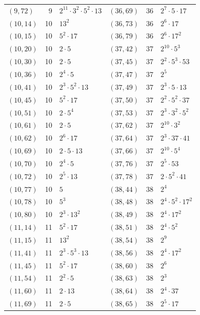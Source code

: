\documentclass[11pt]{article}
\begin{document}
\begin{longtable}{@{}lrl@{\qquad}lrl@{}}
$(9,72)$ & 9 & $2^{11}\cdot 3^{2}\cdot 5^{2}\cdot 13$ & $(36,69)$ & 36 & $2^{7}\cdot 5\cdot 17$\\
$(10,14)$ & 10 & $13^{2}$ & $(36,73)$ & 36 & $2^{6}\cdot 17$\\
$(10,15)$ & 10 & $5^{2}\cdot 17$ & $(36,79)$ & 36 & $2^{6}\cdot 17^{2}$\\
$(10,20)$ & 10 & $2\cdot 5$ & $(37,42)$ & 37 & $2^{10}\cdot 5^{3}$\\
$(10,30)$ & 10 & $2\cdot 5$ & $(37,45)$ & 37 & $2^{2}\cdot 5^{3}\cdot 53$\\
$(10,36)$ & 10 & $2^{4}\cdot 5$ & $(37,47)$ & 37 & $2^{5}$\\
$(10,41)$ & 10 & $2^{3}\cdot 5^{2}\cdot 13$ & $(37,49)$ & 37 & $2^{3}\cdot 5\cdot 13$\\
$(10,45)$ & 10 & $5^{2}\cdot 17$ & $(37,50)$ & 37 & $2^{2}\cdot 5^{2}\cdot 37$\\
$(10,51)$ & 10 & $2\cdot 5^{4}$ & $(37,53)$ & 37 & $2^{3}\cdot 3^{2}\cdot 5^{2}$\\
$(10,61)$ & 10 & $2\cdot 5$ & $(37,62)$ & 37 & $2^{10}\cdot 3^{2}$\\
$(10,62)$ & 10 & $2^{6}\cdot 17$ & $(37,64)$ & 37 & $2^{3}\cdot 37\cdot 41$\\
$(10,69)$ & 10 & $2\cdot 5\cdot 13$ & $(37,66)$ & 37 & $2^{10}\cdot 5^{4}$\\
$(10,70)$ & 10 & $2^{4}\cdot 5$ & $(37,76)$ & 37 & $2^{5}\cdot 53$\\
$(10,72)$ & 10 & $2^{5}\cdot 13$ & $(37,78)$ & 37 & $2\cdot 5^{2}\cdot 41$\\
$(10,77)$ & 10 & $5$ & $(38,44)$ & 38 & $2^{4}$\\
$(10,78)$ & 10 & $5^{3}$ & $(38,48)$ & 38 & $2^{4}\cdot 5^{2}\cdot 17^{2}$\\
$(10,80)$ & 10 & $2^{3}\cdot 13^{2}$ & $(38,49)$ & 38 & $2^{4}\cdot 17^{2}$\\
$(11,14)$ & 11 & $5^{2}\cdot 17$ & $(38,51)$ & 38 & $2^{4}\cdot 5^{2}$\\
$(11,15)$ & 11 & $13^{2}$ & $(38,54)$ & 38 & $2^{9}$\\
$(11,41)$ & 11 & $2^{3}\cdot 5^{3}\cdot 13$ & $(38,56)$ & 38 & $2^{4}\cdot 17^{2}$\\
$(11,45)$ & 11 & $5^{2}\cdot 17$ & $(38,60)$ & 38 & $2^{6}$\\
$(11,54)$ & 11 & $2^{2}\cdot 5$ & $(38,63)$ & 38 & $2^{3}$\\
$(11,60)$ & 11 & $2\cdot 13$ & $(38,64)$ & 38 & $2^{4}\cdot 37$\\
$(11,69)$ & 11 & $2\cdot 5$ & $(38,65)$ & 38 & $2^{5}\cdot 17$\\

\end{longtable}
\end{document}
